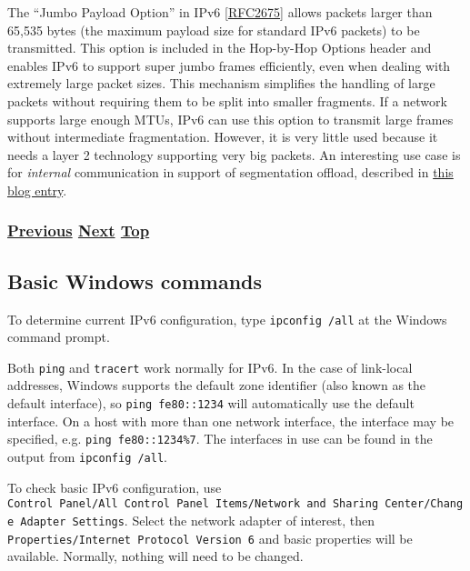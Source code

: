 \documentclass[
]{article}
\begin{document}
The ``Jumbo Payload Option'' in IPv6
{[}\href{https://www.rfc-editor.org/info/rfc2675}{RFC2675}{]} allows
packets larger than 65,535 bytes (the maximum payload size for standard
IPv6 packets) to be transmitted. This option is included in the
Hop-by-Hop Options header and enables IPv6 to support super jumbo frames
efficiently, even when dealing with extremely large packet sizes. This
mechanism simplifies the handling of large packets without requiring
them to be split into smaller fragments. If a network supports large
enough MTUs, IPv6 can use this option to transmit large frames without
intermediate fragmentation. However, it is very little used because it
needs a layer 2 technology supporting very big packets. An interesting
use case is for \emph{internal} communication in support of segmentation
offload, described in
\href{https://www.sipanda.io/post/segmentation-offload-and-protocols-let-s-be-friends}{this
blog entry}.

\subsubsection{\texorpdfstring{\hyperref[energy-consumption]{Previous}
\hyperref[basic-windows-commands]{Next}
\hyperref[management-and-operations]{Top}}{Previous Next Top}}\label{previous-next-top-33}

\pagebreak

\subsection{Basic Windows commands}\label{basic-windows-commands}

To determine current IPv6 configuration, type \texttt{ipconfig\ /all} at
the Windows command prompt.

Both \texttt{ping} and \texttt{tracert} work normally for IPv6. In the
case of link-local addresses, Windows supports the default zone
identifier (also known as the default interface), so
\texttt{ping\ fe80::1234} will automatically use the default interface.
On a host with more than one network interface, the interface may be
specified, e.g. \texttt{ping\ fe80::1234\%7}. The interfaces in use can
be found in the output from \texttt{ipconfig\ /all}.

To check basic IPv6 configuration, use
\texttt{Control\ Panel/All\ Control\ Panel\ Items/Network\ and\ Sharing\ Center/Change\ Adapter\ Settings}.
Select the network adapter of interest, then
\texttt{Properties/Internet\ Protocol\ Version\ 6} and basic properties
will be available. Normally, nothing will need to be changed.
\end{document}
